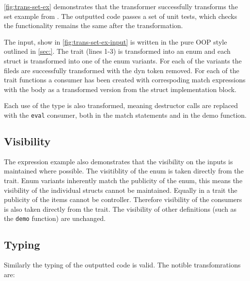 \documentclass[ oneside,%
                    author={James Elgar},
                    degree={MEng},
                     title={Bidirectional transformer between functional and \\ object-oriented programming in Rust},
                  subtitle={}]{dissertation}
\newcommand{\rust}[1]{\texttt{#1}}
\begin{document}
\autoref{fig:trans-set-ex} demonstrates that the transformer successfully transforms the set example from \cite{food}. 
The outputted code passes a set of unit tests, which checks the functionality remains the same after the transformation.

The input, show in \autoref{fig:trans-set-ex-input} is written in the pure OOP style outlined in \autoref{sec:}. The trait (lines 1-3) is transformed into an enum and each struct is transformed into one of the enum variants. For each of the variants the fileds are successfully transformed with the dyn token removed. For each of the trait functions a consumer has been created with correspoding match expressions with the body as a transformed version from the struct implementation block.

Each use of the type is also transformed, meaning destructor calls are replaced with the \rust{eval} consumer, both in the match statements and in the demo function.


\subsection{Visibility}

The expression example also demonstrates that the visibility on the inputs is maintained where possible. The visitiblity of the enum is taken directly from the trait. Enum variants inherently match the publicity of the enum, this means the visibility of the individual structs cannot be maintained. Equally in a trait the publicity of the items cannot be controller. Therefore visibility of the consumers is also taken directly from the trait. The visibility of other definitions (such as the \rust{demo} function) are unchanged.

\subsection{Typing}

Similarly the typing of the outputted code is valid. The notible transfomrations are:
\end{document}
